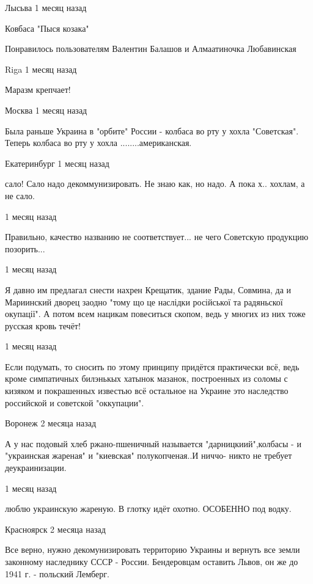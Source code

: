 \begin{itemize}
 Лысьва 1 месяц назад  

Ковбаса "Пыся козака"

Понравилось пользователям Валентин Балашов и Алмаатиночка Любавинская

 Riga 1 месяц назад  

Маразм крепчает!

 Москва 1 месяц назад  

Была раньше Украина в "орбите" России - колбаса во рту у хохла "Советская".
Теперь колбаса во рту у хохла ........американская.

 Екатеринбург 1 месяц назад  

сало! Сало надо декоммунизировать. Не знаю как, но надо. А пока х.. хохлам, а не сало.

 1 месяц назад  

Правильно, качество названию не соответствует... не чего Советскую продукцию позорить...

 1 месяц назад  

Я давно им предлагал снести нахрен Крещатик, здание Рады, Совмина, да и
Мариинский дворец заодно "тому що це наслідки російської та радяньскої
окупації". А потом всем нацикам повеситься скопом, ведь у многих из них тоже
русская кровь течёт!

 1 месяц назад

Если подумать, то сносить по этому принципу придётся практически всё, ведь
кроме симпатичных билэнькых хатынок мазанок, построенных из соломы с кизяком и
покрашенных известью всё остальное на Украине это наследство российской и
советской "оккупации".

 Воронеж 2 месяца назад  

А у нас подовый хлеб ржано-пшеничный называется "дарницкиий",колбасы - и
"украинская жареная" и "киевская" полукопченая..И ниччо- никто не требует
деукраинизации.

 1 месяц назад

люблю украинскую жареную. В глотку идёт охотно. ОСОБЕННО под водку.

 Красноярск 2 месяца назад  

Все верно, нужно декомунизировать территорию Украины и вернуть все земли
законному наследнику СССР - России. Бендеровцам оставить Львов, он же до 1941
г. - польский Лемберг.

\end{itemize}
